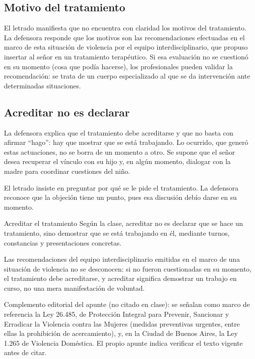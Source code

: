 \documentclass[12pt,oneside]{book}
\begin{document}
\subsection{Motivo del tratamiento}

El letrado manifiesta que no encuentra con claridad los motivos del tratamiento. La defensora responde que los motivos son las recomendaciones efectuadas en el marco de esta situaci\'on de violencia por el equipo interdisciplinario, que propuso insertar al se\~nor en un tratamiento terap\'eutico. Si esa evaluaci\'on no se cuestion\'o en su momento (cosa que pod\'ia hacerse), los profesionales pueden validar la recomendaci\'on: se trata de un cuerpo especializado al que se da intervenci\'on ante determinadas situaciones.

\subsection{Acreditar no es declarar}

La defensora explica que el tratamiento debe acreditarse y que no basta con afirmar ``hago'': hay que mostrar que se est\'a trabajando. Lo ocurrido, que gener\'o estas actuaciones, no se borra de un momento a otro. Se supone que el se\~nor desea recuperar el v\'inculo con su hijo y, en alg\'un momento, dialogar con la madre para coordinar cuestiones del ni\~no.

El letrado insiste en preguntar por qu\'e se le pide el tratamiento. La defensora reconoce que la objeci\'on tiene un punto, pues esa discusi\'on deb\'io darse en su momento.

\begin{definition}{Acreditar el tratamiento}
Seg\'un la clase, acreditar no es declarar que se hace un tratamiento, sino demostrar que se est\'a trabajando en \'el, mediante turnos, constancias y presentaciones concretas.
\end{definition}

\begin{important}
Las recomendaciones del equipo interdisciplinario emitidas en el marco de una situaci\'on de violencia no se desconocen: si no fueron cuestionadas en su momento, el tratamiento debe acreditarse, y acreditar significa demostrar un trabajo en curso, no una mera manifestaci\'on de voluntad.
\end{important}

\begin{note}
Complemento editorial del apunte (no citado en clase): se se\~nalan como marco de referencia la Ley 26.485, de Protecci\'on Integral para Prevenir, Sancionar y Erradicar la Violencia contra las Mujeres (medidas preventivas urgentes, entre ellas la prohibici\'on de acercamiento), y, en la Ciudad de Buenos Aires, la Ley 1.265 de Violencia Dom\'estica. El propio apunte indica verificar el texto vigente antes de citar.
\end{note}
\end{document}

